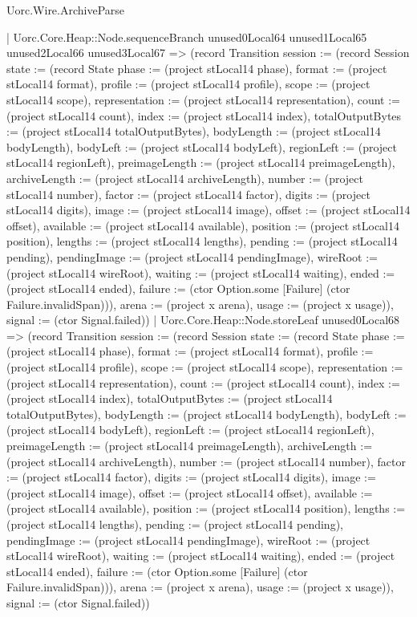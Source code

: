 \begin{lexlean}{Uorc.Wire.ArchiveParse}
\begin{semanticmodule}
{            | Uorc.Core.Heap::Node.sequenceBranch unused0Local64 unused1Local65 unused2Local66 unused3Local67 => (record Transition {session := (record Session {state := (record State {phase := (project stLocal14 phase), format := (project stLocal14 format), profile := (project stLocal14 profile), scope := (project stLocal14 scope), representation := (project stLocal14 representation), count := (project stLocal14 count), index := (project stLocal14 index), totalOutputBytes := (project stLocal14 totalOutputBytes), bodyLength := (project stLocal14 bodyLength), bodyLeft := (project stLocal14 bodyLeft), regionLeft := (project stLocal14 regionLeft), preimageLength := (project stLocal14 preimageLength), archiveLength := (project stLocal14 archiveLength), number := (project stLocal14 number), factor := (project stLocal14 factor), digits := (project stLocal14 digits), image := (project stLocal14 image), offset := (project stLocal14 offset), available := (project stLocal14 available), position := (project stLocal14 position), lengths := (project stLocal14 lengths), pending := (project stLocal14 pending), pendingImage := (project stLocal14 pendingImage), wireRoot := (project stLocal14 wireRoot), waiting := (project stLocal14 waiting), ended := (project stLocal14 ended), failure := (ctor Option.some [Failure] (ctor Failure.invalidSpan))}), arena := (project x arena), usage := (project x usage)}), signal := (ctor Signal.failed)})
            | Uorc.Core.Heap::Node.storeLeaf unused0Local68 => (record Transition {session := (record Session {state := (record State {phase := (project stLocal14 phase), format := (project stLocal14 format), profile := (project stLocal14 profile), scope := (project stLocal14 scope), representation := (project stLocal14 representation), count := (project stLocal14 count), index := (project stLocal14 index), totalOutputBytes := (project stLocal14 totalOutputBytes), bodyLength := (project stLocal14 bodyLength), bodyLeft := (project stLocal14 bodyLeft), regionLeft := (project stLocal14 regionLeft), preimageLength := (project stLocal14 preimageLength), archiveLength := (project stLocal14 archiveLength), number := (project stLocal14 number), factor := (project stLocal14 factor), digits := (project stLocal14 digits), image := (project stLocal14 image), offset := (project stLocal14 offset), available := (project stLocal14 available), position := (project stLocal14 position), lengths := (project stLocal14 lengths), pending := (project stLocal14 pending), pendingImage := (project stLocal14 pendingImage), wireRoot := (project stLocal14 wireRoot), waiting := (project stLocal14 waiting), ended := (project stLocal14 ended), failure := (ctor Option.some [Failure] (ctor Failure.invalidSpan))}), arena := (project x arena), usage := (project x usage)}), signal := (ctor Signal.failed)})
}
\end{semanticmodule}
\end{lexlean}
